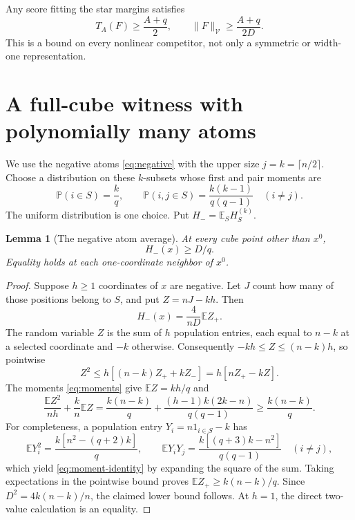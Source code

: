 \documentclass[11pt]{article}
\newtheorem{lemma}[theorem]{Lemma}
\newcommand{\E}{\mathbb E}
\newcommand{\Pp}{\mathbb P}
\newcommand{\norm}[1]{\lVert #1\rVert}
\begin{document}
Any score fitting the star margins satisfies
\begin{equation}\label{eq:lower}
 T_A(F)\ge\frac{A+q}{2},\qquad
 \norm F_{\mathcal V}\ge\frac{A+q}{2D}.
\end{equation}
This is a bound on every nonlinear competitor, not only a symmetric
or width-one representation.

\section{A full-cube witness with polynomially many atoms}

We use the negative atoms \eqref{eq:negative} with the upper size
$j=k=\lceil n/2\rceil$. Choose a distribution on these $k$-subsets
whose first and pair moments are
\begin{equation}\label{eq:moments}
 \Pp(i\in S)=\frac kq,\qquad
 \Pp(i,j\in S)=\frac{k(k-1)}{q(q-1)}\quad(i\ne j).
\end{equation}
The uniform distribution is one choice. Put $H_-=\E_S H_S^{(k)}$.

\begin{lemma}[The negative atom average]\label{lem:negative-average}
At every cube point other than $x^0$,
\[
 H_-(x)\ge D/q.
\]
Equality holds at each one-coordinate neighbor of $x^0$.
\end{lemma}
\begin{proof}
Suppose $h\ge1$ coordinates of $x$ are negative. Let $J$ count
how many of those positions belong to $S$, and put $Z=nJ-kh$.
Then
\[
 H_-(x)=\frac4{nD}\E Z_+.
\]
The random variable $Z$ is the sum of $h$ population entries,
each equal to $n-k$ at a selected coordinate and $-k$ otherwise.
Consequently $-kh\le Z\le(n-k)h$, so pointwise
\[
 Z^2\le h[(n-k)Z_++kZ_-]=h[nZ_+-kZ].
\]
The moments \eqref{eq:moments} give $\E Z=kh/q$ and
\begin{equation}\label{eq:moment-identity}
 \frac{\E Z^2}{nh}+\frac kn\E Z
 =\frac{k(n-k)}q
    +\frac{(h-1)k(2k-n)}{q(q-1)}
 \ge\frac{k(n-k)}q.
\end{equation}
For completeness, a population entry $Y_i=n1_{i\in S}-k$ has
\[
 \E Y_i^2=\frac{k[n^2-(q+2)k]}q,\qquad
 \E Y_iY_j=\frac{k[(q+3)k-n^2]}{q(q-1)}\quad(i\ne j),
\]
which yield \eqref{eq:moment-identity} by expanding the square of
the sum. Taking expectations in the pointwise bound proves
$\E Z_+\ge k(n-k)/q$. Since $D^2=4k(n-k)/n$, the claimed lower
bound follows. At $h=1$, the direct two-value calculation is an
equality.
\end{proof}
\end{document}
